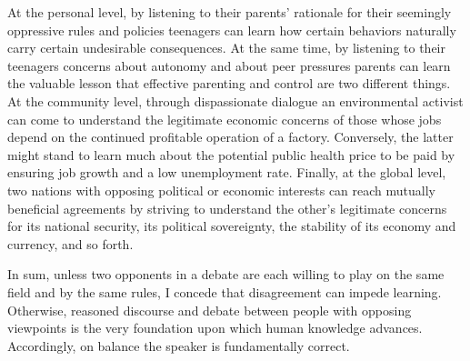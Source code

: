 At the personal level, by listening to their parents' rationale for their seemingly oppressive rules and policies teenagers can learn how certain behaviors naturally carry certain undesirable consequences.
At the same time, by listening to their teenagers concerns about autonomy and about peer pressures parents can learn the valuable lesson that effective parenting and control are two different things.
At the community level, through dispassionate dialogue an environmental activist can come to understand the legitimate economic concerns of those whose jobs depend on the continued profitable operation of a factory.
Conversely, the latter might stand to learn much about the potential public health price to be paid by ensuring job growth and a low unemployment rate.
Finally, at the global level, two nations with opposing political or economic interests can reach mutually beneficial agreements by striving to understand the other's legitimate concerns for its national security, its political sovereignty, the stability of its economy and currency, and so forth.

In sum, unless two opponents in a debate are each willing to play on the same field and by the same rules, I concede that disagreement can impede learning.
Otherwise, reasoned discourse and debate between people with opposing viewpoints is the very foundation upon which human knowledge advances.
Accordingly, on balance the speaker is fundamentally correct.